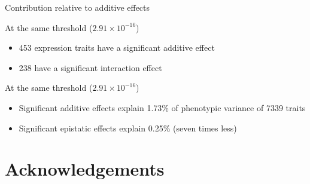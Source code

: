\documentclass{beamer}
\begin{document}
\begin{frame}{Contribution relative to additive effects}
	\begin{block}{At the same threshold ($2.91 \times 10^{-16}$)}
		\begin{itemize}
			\item 453 expression traits have a significant additive effect
			\item 238 have a significant interaction effect
		\end{itemize}
	\end{block}
	\pause
	\begin{block}{At the same threshold ($2.91 \times 10^{-16}$)}
		\begin{itemize}
			\item Significant additive effects explain 1.73\% of phenotypic variance of 7339 traits
			\item Significant epistatic effects explain 0.25\% (seven times less)
		\end{itemize}
	\end{block}
\end{frame}


\section{Acknowledgements}
\subsection{}
\end{document}
